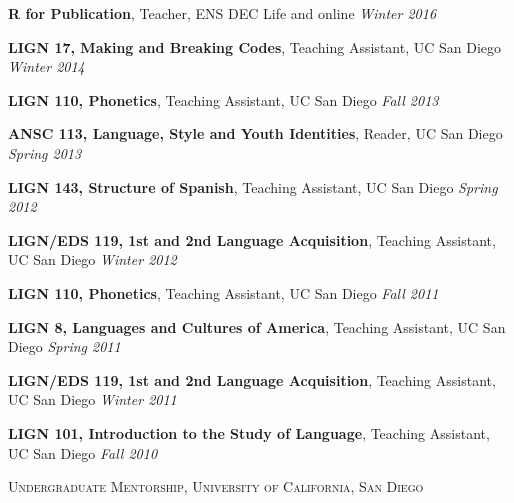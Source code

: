 \documentclass[9pt]{article}
\newenvironment{changemargin}[2]{%
  \begin{list}{}{%
    \setlength{\topsep}{0pt}%
    \setlength{\leftmargin}{#1}%
    \setlength{\rightmargin}{#2}%
    \setlength{\listparindent}{\parindent}%
    \setlength{\itemindent}{\parindent}%
    \setlength{\parsep}{\parskip}%
  }%
  \item[]}{\end{list}
}
\newcommand{\lineover}{
	\begin{changemargin}{-0.05in}{-0.05in}
		\vspace*{-8pt}
		\hrulefill \\
		\vspace*{-2pt}
	\end{changemargin}
}
\newcommand{\header}[1]{
	\begin{changemargin}{-0.5in}{-0.5in}
		\scshape{#1}\\
  	\lineover
	\end{changemargin}
}
\newenvironment{body} {
	\vspace*{-16pt}
	\begin{changemargin}{-0.25in}{-0.5in}
  }	
	{\end{changemargin}
}
\begin{document}
\begin{body}
	\vspace{14pt}
	
	\textbf{R for Publication}, Teacher, ENS DEC Life and online \hfill \emph{Winter 2016}\\
	\medskip

	\textbf{LIGN 17, Making and Breaking Codes}, Teaching Assistant, UC San Diego \hfill \emph{Winter 2014}\\
	\medskip	

	\textbf{LIGN 110, Phonetics}, Teaching Assistant, UC San Diego \hfill \emph{Fall 2013}\\
	\medskip
	
	\textbf{ANSC 113, Language, Style and Youth Identities}, Reader, UC San Diego \hfill \emph{Spring 2013}\\
	\medskip
	
	\textbf{LIGN 143, Structure of Spanish}, Teaching Assistant, UC San Diego \hfill \emph{Spring 2012}\\
	\medskip
	
	\textbf{LIGN/EDS 119, 1st and 2nd Language Acquisition}, Teaching Assistant, UC San Diego \hfill \emph{Winter 2012}\\
	\medskip
	
	\textbf{LIGN 110, Phonetics}, Teaching Assistant, UC San Diego \hfill \emph{Fall 2011}\\
	\medskip
	
	\textbf{LIGN 8, Languages and Cultures of America}, Teaching Assistant, UC San Diego \hfill \emph{Spring 2011}\\
	\medskip
	
	\textbf{LIGN/EDS 119, 1st and 2nd Language Acquisition}, Teaching Assistant, UC San Diego \hfill \emph{Winter 2011}\\
	\medskip
	
	\textbf{LIGN 101, Introduction to the Study of Language}, Teaching Assistant, UC San Diego \hfill \emph{Fall 2010}\\
	
\end{body}

\smallskip


\header{Undergraduate Mentorship, University of California, San Diego}
\end{document}
